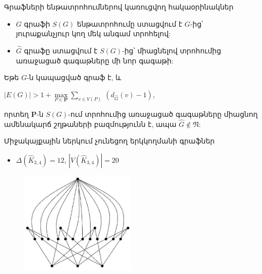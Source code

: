 \begin{frame}{Գրաֆների ենթատրոհումներով կառուցվող հակաօրինակներ}
\begin{itemize}
\item $G$ գրաֆի $S(G)$ ենթատրոհումը ստացվում է $G$-ից՝ յուրաքանչյուր կող մեկ անգամ տրոհելով:
\item $\widehat{G}$ գրաֆը ստացվում է $S(G)$-ից՝ միացնելով տրոհումից առաջացած գագաթները մի նոր գագաթի:
\end{itemize}
\begin{theorem}[3.3.14]
Եթե $G$-ն կապացված գրաֆ է, և
\begin{center}
$\vert E(G)\vert
> 1+ {\max\limits_{P\in \mathbf{P}}}{\sum\limits_{v\in
V(P)}}\ \left(d_{\widehat{G}}(v)-1\right)$,
\end{center}
որտեղ $\mathbf{P}$-ն $S(G)$-ում տրոհումից առաջացած գագաթները միացնող ամենակարճ շղթաների բազմությունն է, ապա $\widehat{G}\notin \mathfrak{N}$:
\end{theorem}


\end{frame}

\begin{frame}{Միջակայքային ներկում չունեցող երկկողմանի գրաֆներ}
\begin{itemize}
	\item $\Delta(\widehat{K}_{3,4})=12$, $|V(\widehat{K}_{3,4})|=20$
\end{itemize}

\begin{figure}[h]
\begin{center}
\includegraphics[width=0.5\textwidth]{figures/subdivisionK34.eps}
\end{center}
\end{figure}
\end{frame}


